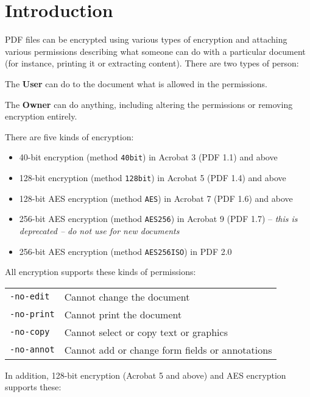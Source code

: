 \documentclass{book}
\begin{document}
  \section{Introduction}
  PDF files can be encrypted using various types of encryption and attaching
various permissions describing what someone can do with a particular document
(for instance, printing it or extracting content). There are two types of
person:
  \begin{description}
    \item The \textbf{User} can do to the document what is allowed in the permissions.
    \item The \textbf{Owner} can do anything, including altering the permissions or removing encryption entirely.
  \end{description}
  There are five kinds of encryption:
  \begin{itemize}
  \item 40-bit encryption (method \texttt{40bit}) in Acrobat 3 (PDF 1.1) and above
  \item 128-bit encryption (method \texttt{128bit}) in Acrobat 5 (PDF 1.4) and above
  \item 128-bit AES encryption (method \texttt{AES}) in Acrobat 7 (PDF 1.6) and above
  \item 256-bit AES encryption (method \texttt{AES256}) in Acrobat 9 (PDF 1.7) -- \textit{this is deprecated -- do not use for new documents}
  \item 256-bit AES encryption (method \texttt{AES256ISO}) in PDF 2.0
  \end{itemize}

   \vspace{2mm}
   \noindent All encryption supports these kinds of permissions:

   \vspace{2mm}
   \begin{tabular}{ll}
     \texttt{-no-edit} & Cannot change the document\\
     \texttt{-no-print} & Cannot print the document\\
     \texttt{-no-copy} & Cannot select or copy text or graphics\\
     \texttt{-no-annot} & Cannot add or change form fields or annotations\\
   \end{tabular}

   \vspace{2mm}
   \noindent In addition, 128-bit encryption (Acrobat 5 and above) and AES encryption supports these:
\end{document}

